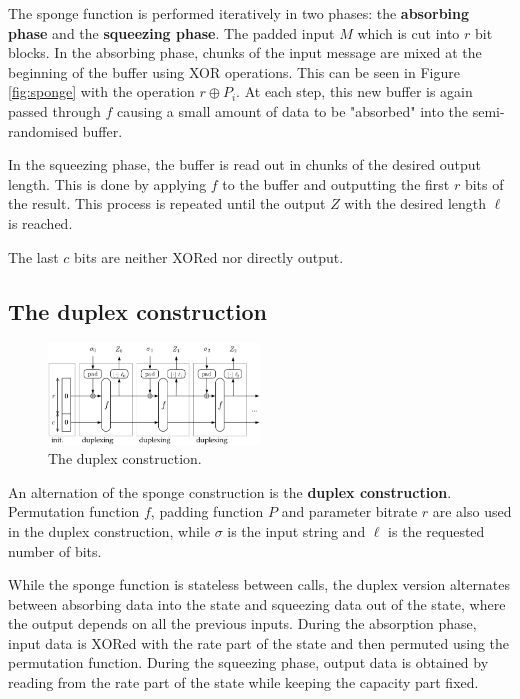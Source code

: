 The sponge function is performed iteratively in two phases: the \textbf{absorbing phase} and the \textbf{squeezing phase}. The padded input $M$ which is cut into $r$ bit blocks. In the absorbing phase, chunks of the input message are mixed at the beginning of the buffer using XOR operations. This can be seen in Figure \ref{fig:sponge} with the operation $r \oplus P_i$. At each step, this new buffer is again passed through $f$ causing a small amount of data to be "absorbed" into the semi-randomised buffer. \cite{keccak_team, sponge_function_2023,DBLP:journals/joc/DobraunigEMS21} \par 

In the squeezing phase, the buffer is read out in chunks of the desired output length. This is done by applying $f$ to the buffer and outputting the first $r$ bits of the result. This process is repeated until the output $Z$ with the desired length $\ell$ is reached. \cite{keccak_team,sponge_function_2023,DBLP:journals/joc/DobraunigEMS21} \par 

The last $c$ bits are neither XORed nor directly output. \par 

\subsection{The duplex construction}

\begin{figure}[htbp]
  \centering
  \includegraphics[width=0.5\textwidth]{images/Duplex-150.png}
  \caption{The duplex construction.}
  \label{fig:duplex}
\end{figure}

An alternation of the sponge construction is the \textbf{duplex construction}. Permutation function $f$, padding function $P$ and parameter bitrate $r$ are also used in the duplex construction, while $\sigma$ is the input string and $\ell$ is the requested number of bits. \cite{keccak_team,sponge_function_2023,guido_b_d_michaël_p_2011} \par 

While the sponge function is stateless between calls, the duplex version alternates between absorbing data into the state and squeezing data out of the state, where the output depends on all the previous inputs. \cite{guido_b_d_michaël_p_2011,cryptoeprint:2023/796} During the absorption phase, input data is XORed with the rate part of the state and then permuted using the permutation function. During the squeezing phase, output data is obtained by reading from the rate part of the state while keeping the capacity part fixed. \par

